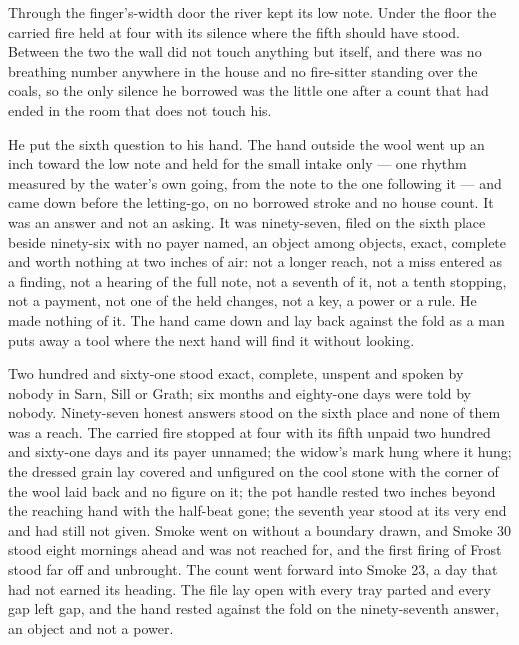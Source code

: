 Through the finger's-width door the river kept its low note. Under the floor the carried fire held at four with its silence where the fifth should have stood. Between the two the wall did not touch anything but itself, and there was no breathing number anywhere in the house and no fire-sitter standing over the coals, so the only silence he borrowed was the little one after a count that had ended in the room that does not touch his.

He put the sixth question to his hand. The hand outside the wool went up an inch toward the low note and held for the small intake only --- one rhythm measured by the water's own going, from the note to the one following it --- and came down before the letting-go, on no borrowed stroke and no house count. It was an answer and not an asking. It was ninety-seven, filed on the sixth place beside ninety-six with no payer named, an object among objects, exact, complete and worth nothing at two inches of air: not a longer reach, not a miss entered as a finding, not a hearing of the full note, not a seventh of it, not a tenth stopping, not a payment, not one of the held changes, not a key, a power or a rule. He made nothing of it. The hand came down and lay back against the fold as a man puts away a tool where the next hand will find it without looking.

Two hundred and sixty-one stood exact, complete, unspent and spoken by nobody in Sarn, Sill or Grath; six months and eighty-one days were told by nobody. Ninety-seven honest answers stood on the sixth place and none of them was a reach. The carried fire stopped at four with its fifth unpaid two hundred and sixty-one days and its payer unnamed; the widow's mark hung where it hung; the dressed grain lay covered and unfigured on the cool stone with the corner of the wool laid back and no figure on it; the pot handle rested two inches beyond the reaching hand with the half-beat gone; the seventh year stood at its very end and had still not given. Smoke went on without a boundary drawn, and Smoke 30 stood eight mornings ahead and was not reached for, and the first firing of Frost stood far off and unbrought. The count went forward into Smoke 23, a day that had not earned its heading. The file lay open with every tray parted and every gap left gap, and the hand rested against the fold on the ninety-seventh answer, an object and not a power.
